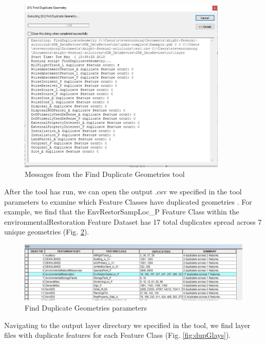 \documentclass[openany]{book}
\theoremstyle{definition}
\theoremstyle{definition}
\theoremstyle{definition}
\theoremstyle{remark}
\begin{document}
\begin{figure}[H]

{\centering \includegraphics[width=3.92in,]{figures/dupG-messages} 

}

\caption{Messages from the Find Duplicate Geometries tool}\label{fig:dupGmessages}
\end{figure}

After the tool has run, we can open the output .csv we specified in the
tool parameters to examine which Feature Classes have duplicated
geometries . For example, we find that the EnvRestorSampLoc\_P Feature
Class within the environmentalRestoration Feature Dataset has 17 total
duplicates spread across 7 unique geometries (Fig. \ref{fig:dupGcsv}).

\begin{figure}[H]

{\centering \includegraphics[width=4.8in,]{figures/dupG-csv} 

}

\caption{Find Duplicate Geometries parameters}\label{fig:dupGcsv}
\end{figure}

Navigating to the output layer directory we specified in the tool, we
find layer files with duplicate features for each Feature Class (Fig.
\ref{fig:dupGlays}).
\end{document}
